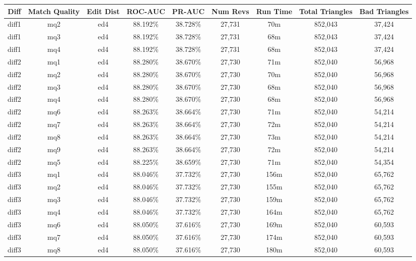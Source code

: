 \begin{sidewaystable}[!tp]
  \begin{center}
    \begin{tabular}{|c|c|c||c|c||c|c|c|c|}
\hline
Diff & Match Quality & Edit Dist
        & ROC-AUC & PR-AUC
        & Num Revs & Run Time
        & Total Triangles & Bad Triangles \\
\hline
\hline
diff1 & mq2 & ed4 & 88.192\% & 38.728\% & 27,731 & 70m & 852,043 & 37,424 \\
diff1 & mq3 & ed4 & 88.192\% & 38.728\% & 27,731 & 68m & 852,043 & 37,424 \\
diff1 & mq4 & ed4 & 88.192\% & 38.728\% & 27,731 & 68m & 852,043 & 37,424 \\
diff2 & mq1 & ed4 & 88.280\% & 38.670\% & 27,730 & 71m & 852,040 & 56,968 \\
diff2 & mq2 & ed4 & 88.280\% & 38.670\% & 27,730 & 70m & 852,040 & 56,968 \\
diff2 & mq3 & ed4 & 88.280\% & 38.670\% & 27,730 & 68m & 852,040 & 56,968 \\
diff2 & mq4 & ed4 & 88.280\% & 38.670\% & 27,730 & 68m & 852,040 & 56,968 \\
diff2 & mq6 & ed4 & 88.263\% & 38.664\% & 27,730 & 71m & 852,040 & 54,214 \\
diff2 & mq7 & ed4 & 88.263\% & 38.664\% & 27,730 & 72m & 852,040 & 54,214 \\
diff2 & mq8 & ed4 & 88.263\% & 38.664\% & 27,730 & 73m & 852,040 & 54,214 \\
diff2 & mq9 & ed4 & 88.263\% & 38.664\% & 27,730 & 72m & 852,040 & 54,214 \\
diff2 & mq5 & ed4 & 88.225\% & 38.659\% & 27,730 & 71m & 852,040 & 54,354 \\
diff3 & mq1 & ed4 & 88.046\% & 37.732\% & 27,730 & 156m & 852,040 & 65,762 \\
diff3 & mq2 & ed4 & 88.046\% & 37.732\% & 27,730 & 155m & 852,040 & 65,762 \\
diff3 & mq3 & ed4 & 88.046\% & 37.732\% & 27,730 & 159m & 852,040 & 65,762 \\
diff3 & mq4 & ed4 & 88.046\% & 37.732\% & 27,730 & 164m & 852,040 & 65,762 \\
diff3 & mq6 & ed4 & 88.050\% & 37.616\% & 27,730 & 169m & 852,040 & 60,593 \\
diff3 & mq7 & ed4 & 88.050\% & 37.616\% & 27,730 & 174m & 852,040 & 60,593 \\
diff3 & mq8 & ed4 & 88.050\% & 37.616\% & 27,730 & 180m & 852,040 & 60,593 \\

\end{tabular}
\end{center}
\end{sidewaystable}
